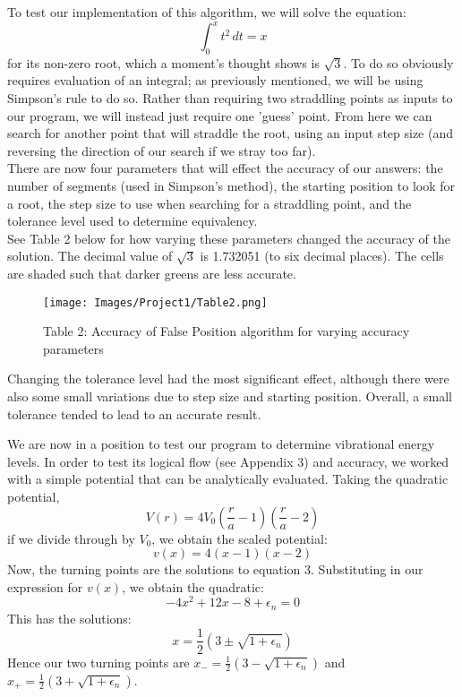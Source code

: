 \documentclass[10pt]{article}
\begin{document}
{To test our implementation of this algorithm, we will solve the equation:
\begin{equation} \int_{0}^{x} t^2 \,dt = x \end{equation}
for its non-zero root, which a moment's thought shows is $\sqrt{3}$. To do so obviously requires evaluation of an integral; as previously mentioned, we will be using Simpson's rule to do so. Rather than requiring two straddling points as inputs to our program, we will instead just require one 'guess' point. From here we can search for another point that will straddle the root, using an input step size (and reversing the direction of our search if we stray too far).\\
There are now four parameters that will effect the accuracy of our answers: the number of segments (used in Simpson's method), the starting position to look for a root, the step size to use when searching for a straddling point, and the tolerance level used to determine equivalency. \\
See Table 2 below for how varying these parameters changed the accuracy of the solution. The decimal value of $\sqrt{3}$ is 1.732051 (to six decimal places). The cells are shaded such that darker greens are less accurate. 

\begin{figure}[h]
\texttt{[image: Images/Project1/Table2.png]}\centering \caption*{\footnotesize Table 2: Accuracy of False Position algorithm for varying accuracy parameters} \end{figure}

Changing the tolerance level had the most significant effect, although there were also some small variations due to step size and starting position. Overall, a small tolerance tended to lead to an accurate result.

We are now in a position to test our program to determine vibrational energy levels. In order to test its logical flow (see Appendix 3) and accuracy, we worked with a simple potential that can be analytically evaluated. Taking the quadratic potential,
\begin{equation} V(r) = 4 V_0 (\frac{r}{a} - 1)(\frac{r}{a} - 2) \end{equation}
if we divide through by $V_0$, we obtain the scaled potential:
\begin{equation} v(x) = 4 (x - 1) (x-2) \end{equation}
Now, the turning points are the solutions to equation 3. Substituting in our expression for $v(x)$, we obtain the quadratic:
\begin{equation} -4x^2 + 12 x - 8  + \epsilon_n = 0 \end{equation}
This has the solutions:
\begin{equation} x = \frac{1}{2} (3 \pm \sqrt{1 + \epsilon_n}) \end{equation}
Hence our two turning points are $x_- = \frac{1}{2} (3 - \sqrt{1 + \epsilon_n})$ and $x_+ = \frac{1}{2} (3 + \sqrt{1 + \epsilon_n})$.

}
\end{document}
